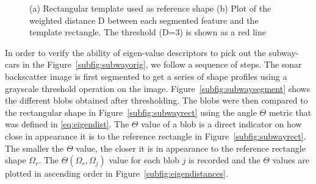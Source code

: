 \documentclass {udthesis}
\begin{document}
\begin{figure}
\centering
\caption{(a) Rectangular template used as reference shape (b) Plot of the weighted distance D between each segmented feature and the template rectangle. The threshold (D=3) is shown as a red line}
\end{figure}


In order to verify the ability of eigen-value descriptors to pick out the subway-cars in the Figure~\ref{subfig:subwayorig}, we follow a sequence of steps. The sonar backscatter image is first segmented to get a series of shape profiles using a grayscale threshold operation on the image. Figure~\ref{subfig:subwaysegment} shows the different blobs obtained after thresholding. The blobs were then compared to the rectangular shape in Figure~\ref{subfig:subwayrect} using the angle $\Theta$ metric that was defined in \eqref{eq:eigendist}. The $\Theta$ value of a blob is a direct indicator on how close in appearance it is to the reference rectangle in Figure~\ref{subfig:subwayrect}. The smaller the $\Theta$ value, the closer it is in appearance to the reference rectangle shape $\Omega_r$. The $\Theta(\Omega_r,\Omega_j)$ value for each blob $j$ is recorded and the $\Theta$ values are plotted in ascending order in Figure~\ref{subfig:eigendistances}. 
\end{document}
